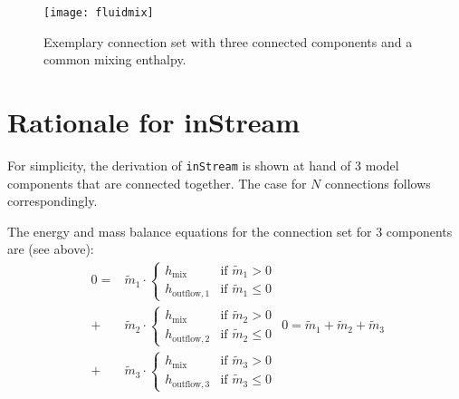 \begin{figure}[H]
  \begin{center}
    \texttt{[image: fluidmix]}
  \end{center}
  \caption{%
    Exemplary connection set with three connected components and a common mixing enthalpy.
  }
\end{figure}

\section{Rationale for inStream}\label{rationale-for-the-formulation-of-the-instream-operator}\label{rationale-for-instream}

For simplicity, the derivation of \lstinline!inStream! is shown at hand of 3 model components that are connected together.
The case for $N$ connections follows correspondingly.

The energy and mass balance equations for the connection set for 3 components are (see above):
\begin{subequations}
\label{eq:D1}
\begin{equation}
\begin{split}
0=&\tilde{m}_1\cdot
\begin{cases}
h_{\mathrm{mix}}&\text{if $\tilde{m}_1>0$}\\
h_{\mathrm{outflow},1}&\text{if $\tilde{m}_1 \leq 0$}
\end{cases}\\
+&\tilde{m}_2\cdot
\begin{cases}
h_{\mathrm{mix}}&\text{if $\tilde{m}_2>0$}\\
h_{\mathrm{outflow},2}&\text{if $\tilde{m}_2 \leq 0$}
\end{cases}\\
+&\tilde{m}_3\cdot
\begin{cases}
h_{\mathrm{mix}}&\text{if $\tilde{m}_3>0$}\\
h_{\mathrm{outflow},3}&\text{if $\tilde{m}_3 \leq 0$}
\end{cases}
\end{split}
\label{eq:D1a}
\end{equation}
\begin{equation}
0=\tilde{m}_1+\tilde{m}_2+\tilde{m}_3
\label{eq:D1b}
\end{equation}
\end{subequations}

